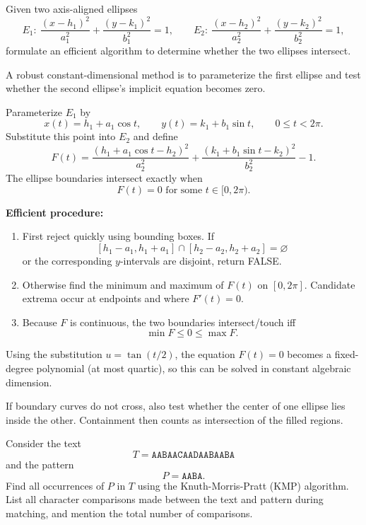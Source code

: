 \documentclass[11pt,a4paper]{article}
\begin{document}
\begin{qaquestion}
Given two axis-aligned ellipses
\[
E_1:\ \frac{(x-h_1)^2}{a_1^2}+\frac{(y-k_1)^2}{b_1^2}=1,
\qquad
E_2:\ \frac{(x-h_2)^2}{a_2^2}+\frac{(y-k_2)^2}{b_2^2}=1,
\]
formulate an efficient algorithm to determine whether the two ellipses intersect.
\end{qaquestion}

\begin{qaanswer}[Answer 2(b)]
A robust constant-dimensional method is to parameterize the first ellipse and test whether the second ellipse's implicit equation becomes zero.

Parameterize \(E_1\) by
\[
x(t)=h_1+a_1\cos t,\qquad y(t)=k_1+b_1\sin t,
\qquad 0\le t<2\pi.
\]
Substitute this point into \(E_2\) and define
\[
F(t)=
\frac{(h_1+a_1\cos t-h_2)^2}{a_2^2}
+
\frac{(k_1+b_1\sin t-k_2)^2}{b_2^2}
-1.
\]
The ellipse boundaries intersect exactly when
\[
\boxed{F(t)=0\text{ for some }t\in[0,2\pi).}
\]

\textbf{Efficient procedure:}
\begin{enumerate}[leftmargin=1.7em]
\item First reject quickly using bounding boxes. If
\[
[h_1-a_1,h_1+a_1]\cap[h_2-a_2,h_2+a_2]=\varnothing
\]
or the corresponding \(y\)-intervals are disjoint, return FALSE.
\item Otherwise find the minimum and maximum of \(F(t)\) on \([0,2\pi]\). Candidate extrema occur at endpoints and where \(F'(t)=0\).
\item Because \(F\) is continuous, the two boundaries intersect/touch iff
\[
\boxed{\min F\le0\le\max F}.
\]
\end{enumerate}

Using the substitution \(u=\tan(t/2)\), the equation \(F(t)=0\) becomes a fixed-degree polynomial (at most quartic), so this can be solved in constant algebraic dimension.

\begin{pointbox}
If boundary curves do not cross, also test whether the center of one ellipse lies inside the other. Containment then counts as intersection of the filled regions.
\end{pointbox}
\end{qaanswer}

\begin{qaquestion}
Consider the text
\[
T=\texttt{AABAACAADAABAABA}
\]
and the pattern
\[
P=\texttt{AABA}.
\]
Find all occurrences of \(P\) in \(T\) using the Knuth-Morris-Pratt (KMP) algorithm. List all character comparisons made between the text and pattern during matching, and mention the total number of comparisons.
\end{qaquestion}
\end{document}

